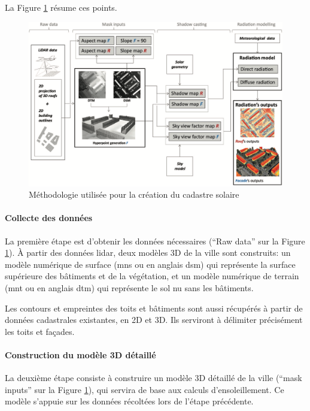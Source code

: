 \par{La Figure \ref{fig:cadastre_solaire_methodologie} résume ces points.}
\begin{figure}[H]
    \centering
    \includegraphics[width=1\linewidth]{02-main//figures/ch2/cadastre_solaire_methodologie.png}
    \caption{Méthodologie utilisée pour la création du cadastre solaire \cite{desthieux_solar_2018}}
    \label{fig:cadastre_solaire_methodologie}
\end{figure}

\paragraph{Collecte des données}
\par{La première étape est d'obtenir les données nécessaires (``Raw data'' sur la Figure \ref{fig:cadastre_solaire_methodologie}). À partir des données \gls{lidar}, deux modèles 3D de la ville sont construits: un modèle numérique de surface (\acrshort{mns} ou en anglais \acrshort{dsm}) qui représente la surface supérieure des bâtiments et de la végétation, et un modèle numérique de terrain (\acrshort{mnt} ou en anglais \acrshort{dtm}) qui représente le sol nu sans les bâtiments.}
\par{Les contours et empreintes des toits et bâtiments  sont aussi récupérés à partir de données cadastrales existantes, en 2D et 3D. Ils serviront à délimiter précisément les toits et façades.}

\paragraph{Construction du modèle 3D détaillé}

La deuxième étape consiste à construire un modèle 3D détaillé de la ville (``mask inputs'' sur la Figure \ref{fig:cadastre_solaire_methodologie}), qui servira de base aux calculs d'ensoleillement. Ce modèle s'appuie sur les données récoltées lors de l'étape précédente.

